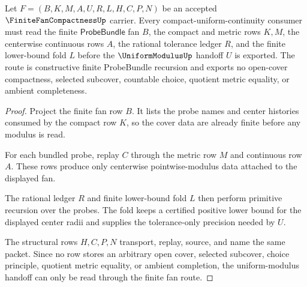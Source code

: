 \begin{theorem}\label{thm:finite-fan-compactness-uniform-modulus-route}
Let $F=(B,K,M,A,U,R,L,H,C,P,N)$ be an accepted $\FiniteFanCompactnessUp$ carrier. Every compact-uniform-continuity consumer must read the finite $\mathsf{ProbeBundle}$ fan $B$, the compact and metric rows $K,M$, the centerwise continuous rows $A$, the rational tolerance ledger $R$, and the finite lower-bound fold $L$ before the $\UniformModulusUp$ handoff $U$ is exported. The route is constructive finite ProbeBundle recursion and exports no open-cover compactness, selected subcover, countable choice, quotient metric equality, or ambient completeness.
\end{theorem}
\begin{proof}
Project the finite fan row $B$. It lists the probe names and center histories consumed by the compact row $K$, so the cover data are already finite before any modulus is read.

For each bundled probe, replay $C$ through the metric row $M$ and continuous row $A$. These rows produce only centerwise pointwise-modulus data attached to the displayed fan.

The rational ledger $R$ and finite lower-bound fold $L$ then perform primitive recursion over the probes. The fold keeps a certified positive lower bound for the displayed center radii and supplies the tolerance-only precision needed by $U$.

The structural rows $H,C,P,N$ transport, replay, source, and name the same packet. Since no row stores an arbitrary open cover, selected subcover, choice principle, quotient metric equality, or ambient completion, the uniform-modulus handoff can only be read through the finite fan route.
\end{proof}


\begin{closurestatus}{\FiniteFanCompactnessUp}
  \theoryclosure{\seedClosure}
  \formalstatus{\formalTargetV}
\end{closurestatus}

